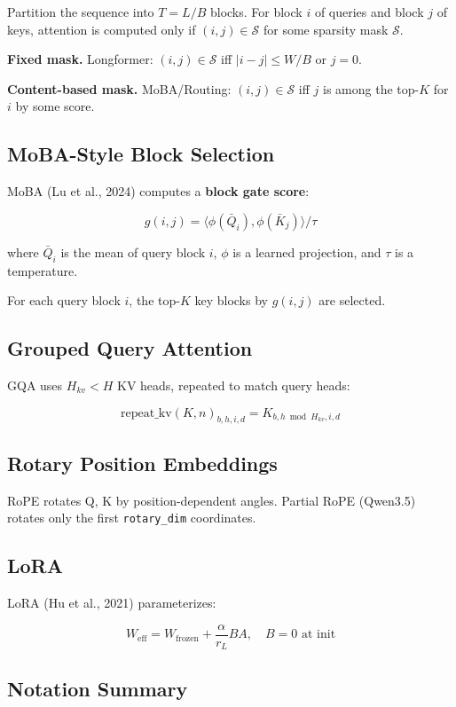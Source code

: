 Partition the sequence into $T = L / B$ blocks. For block $i$ of queries 
and block $j$ of keys, attention is computed only if $(i, j) \in \mathcal{S}$ 
for some sparsity mask $\mathcal{S}$.

\textbf{Fixed mask.} Longformer: $(i, j) \in \mathcal{S}$ iff $|i - j| \leq W/B$ 
or $j = 0$.

\textbf{Content-based mask.} MoBA/Routing: $(i, j) \in \mathcal{S}$ iff $j$ 
is among the top-$K$ for $i$ by some score.

\subsection{MoBA-Style Block Selection}

MoBA (Lu et al., 2024) computes a \textbf{block gate score}:

\[
g(i, j) = \langle \phi(\bar{Q}_i), \phi(\bar{K}_j) \rangle / \tau
\tag{3.2}
\]

where $\bar{Q}_i$ is the mean of query block $i$, $\phi$ is a learned 
projection, and $\tau$ is a temperature.

For each query block $i$, the top-$K$ key blocks by $g(i, j)$ are selected.

\subsection{Grouped Query Attention}

GQA uses $H_{kv} < H$ KV heads, repeated to match query heads:

\[
\text{repeat\_kv}(K, n)_{b, h, i, d} = K_{b, h \bmod H_{kv}, i, d}
\tag{3.3}
\]

\subsection{Rotary Position Embeddings}

RoPE rotates Q, K by position-dependent angles. Partial RoPE (Qwen3.5) 
rotates only the first \texttt{rotary\_dim} coordinates.

\subsection{LoRA}

LoRA (Hu et al., 2021) parameterizes:

\[
W_\text{eff} = W_\text{frozen} + \frac{\alpha}{r_L} B A, \quad B = 0 \text{ at init}
\tag{3.4}
\]

\subsection{Notation Summary}


